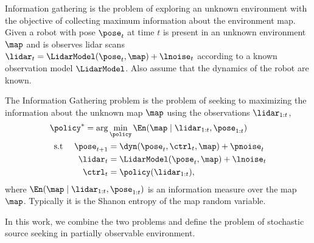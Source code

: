Information gathering is the problem of exploring an unknown environment with
the objective of collecting maximum information about the environment map. Given a robot with pose $\pose_t$ at time $t$ is present in an unknown
environment $\map$ and is observes lidar scans $\lidar_t = \LidarModel(\pose_t,
\map) + \lnoise_t$ according to a known observation model $\LidarModel$. Also
assume that the dynamics of the robot are known.
\begin{problem}
The Information Gathering
problem is the problem of seeking to maximizing the information about the unknown
map $\map$ using the observations $\lidar_{1:t}$,
%
\begin{equation}\begin{split}
      \policy^* = \arg&\min_{\policy} \En(\map \mid \lidar_{1:t}, \pose_{1:t})
      \\
      \text{s.t } \quad
  \pose_{t+1} &= \dyn(\pose_t, \ctrl_t, \map) + \pnoise_t
  \\
  \lidar_{t} &= \LidarModel(\pose_t, \map) + \lnoise_t
  \\
  \ctrl_t &= \policy(\lidar_{1:t}),
\end{split}\end{equation}
%
where $\En(\map \mid \lidar_{1:t}, \pose_{1:t})$ is an information measure over
the map $\map$. Typically it is the Shanon entropy of the map random variable.
\end{problem}

In this work, we combine the two problems and define the problem of stochastic
source seeking in partially observable environment.